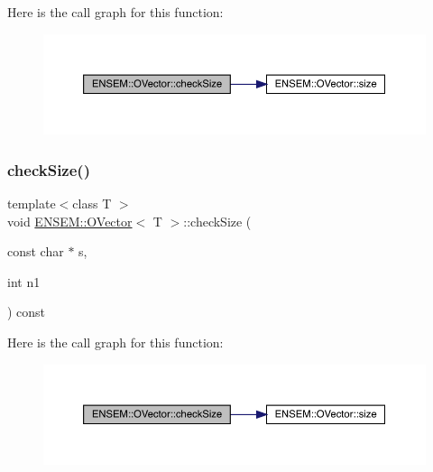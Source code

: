 Here is the call graph for this function\+:
\nopagebreak
\begin{figure}[H]
\begin{center}
\leavevmode
\includegraphics[width=350pt]{d0/d8d/classENSEM_1_1OVector_a1446ad09778db3a287fb5f6fec304b22_cgraph}
\end{center}
\end{figure}
\mbox{\label{classENSEM_1_1OVector_a1446ad09778db3a287fb5f6fec304b22}} 
\subsubsection{\texorpdfstring{checkSize()}{checkSize()}\hspace{0.1cm}{\footnotesize\ttfamily [4/4]}}
{\footnotesize\ttfamily template$<$class T $>$ \\
void \mbox{\hyperlink{classENSEM_1_1OVector}{E\+N\+S\+E\+M\+::\+O\+Vector}}$<$ T $>$\+::check\+Size (\begin{DoxyParamCaption}\item[{const char $\ast$}]{s,  }\item[{int}]{n1 }\end{DoxyParamCaption}) const\hspace{0.3cm}{\ttfamily [inline]}}

Here is the call graph for this function\+:
\nopagebreak
\begin{figure}[H]
\begin{center}
\leavevmode
\includegraphics[width=350pt]{d0/d8d/classENSEM_1_1OVector_a1446ad09778db3a287fb5f6fec304b22_cgraph}
\end{center}
\end{figure}
\mbox{\label{classENSEM_1_1OVector_a8d84b5c1145d0647107413d254450417}} 
